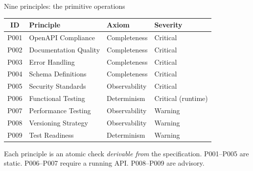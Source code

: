 \documentclass[10pt,aspectratio=169]{beamer}
\begin{document}
\begin{frame}{Nine principles: the primitive operations}

\begin{center}
\small
\begin{tabular}{@{}cll l@{}}
\textbf{ID} & \textbf{Principle} & \textbf{Axiom} & \textbf{Severity} \\
\hline
P001 & OpenAPI Compliance       & Completeness   & Critical \\
P002 & Documentation Quality    & Completeness   & Critical \\
P003 & Error Handling           & Completeness   & Critical \\
P004 & Schema Definitions       & Completeness   & Critical \\
P005 & Security Standards       & Observability  & Critical \\
\hline
P006 & Functional Testing       & Determinism    & Critical (runtime) \\
P007 & Performance Testing      & Observability  & Warning \\
\hline
P008 & Versioning Strategy      & Observability  & Warning \\
P009 & Test Readiness           & Determinism    & Warning \\
\end{tabular}
\end{center}

\vspace{1em}
\footnotesize
Each principle is an atomic check \emph{derivable from} the
specification. P001--P005 are static. P006--P007 require a running API.
P008--P009 are advisory.

\end{frame}
\end{document}
